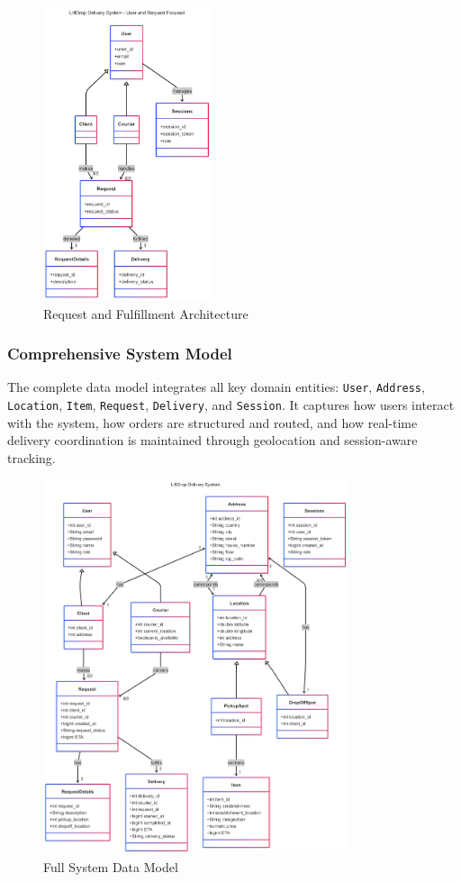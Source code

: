 \begin{figure}[H]
    \centering
    \includegraphics[width=0.44\textwidth]{images/UserSessions.png}
    \caption{Request and Fulfillment Architecture}
\end{figure}

\newpage

\subsubsection{Comprehensive System Model}

The complete data model integrates all key domain entities: \texttt{User}, \texttt{Address}, \texttt{Location}, \texttt{Item}, \texttt{Request}, \texttt{Delivery}, and \texttt{Session}. It captures how users interact with the system, how orders are structured and routed, and how real-time delivery coordination is maintained through geolocation and session-aware tracking.

\begin{figure}[H]
    \centering
    \includegraphics[width=0.8\textwidth]{images/FullDiagram.png}
    \caption{Full System Data Model}
\end{figure}
